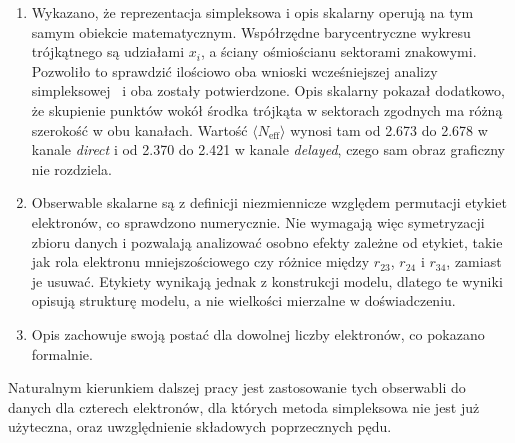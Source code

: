 \documentclass[12pt,a4paper]{article}
\newcommand{\Neff}{N_{\mathrm{eff}}}
\begin{document}
\begin{enumerate}
        podział pędu jest mniej równomierny. W kanale \emph{delayed}
        efektywna liczba elektronów i stosunek $\langle K/A\rangle$
        pozostają stałe, więc wzrost skali nierównowagi
        $\langle K\rangle$ nie oznacza zmiany nierównomierności podziału.
        Zmieniają się tam natomiast średni udział pędu elektronu
        mniejszościowego $\langle x_{\mathrm{mn}}\rangle$ oraz średnia
        korelacja par. Zmiany symetrycznych obserwabli podziału
        wywołane intensywnością są wielokrotnie mniejsze od różnicy
        między kanałami, która dla $\langle\Neff\rangle$ wynosi od
        \num{0.254} do \num{0.299}.
        Sposób podziału pędu jest więc przede wszystkim własnością
        ścieżki jonizacji.
  \item Wykazano, że reprezentacja simpleksowa i opis skalarny operują
        na tym samym obiekcie matematycznym. Współrzędne barycentryczne
        wykresu trójkątnego są udziałami $x_i$, a ściany ośmiościanu
        sektorami znakowymi. Pozwoliło to sprawdzić ilościowo oba
        wnioski wcześniejszej analizy simpleksowej~\cite{Ojczenasz2023}
        i oba zostały potwierdzone. Opis skalarny pokazał dodatkowo, że
        skupienie punktów wokół środka trójkąta w sektorach zgodnych ma
        różną szerokość w obu kanałach. Wartość $\langle\Neff\rangle$
        wynosi tam od \num{2.673} do \num{2.678} w kanale \emph{direct}
        i od \num{2.370} do \num{2.421} w kanale \emph{delayed}, czego
        sam obraz graficzny nie rozdziela.
  \item Obserwable skalarne są z definicji niezmiennicze względem
        permutacji etykiet elektronów, co sprawdzono numerycznie. Nie
        wymagają więc symetryzacji zbioru danych i pozwalają analizować
        osobno efekty zależne od etykiet, takie jak rola elektronu
        mniejszościowego czy różnice między $r_{23}$, $r_{24}$
        i $r_{34}$, zamiast je usuwać. Etykiety wynikają jednak
        z konstrukcji modelu, dlatego te wyniki opisują strukturę
        modelu, a nie wielkości mierzalne w doświadczeniu.
  \item Opis zachowuje swoją postać dla dowolnej liczby elektronów, co
        pokazano formalnie.
\end{enumerate}
Naturalnym kierunkiem dalszej pracy jest zastosowanie tych obserwabli
do danych dla czterech elektronów, dla których metoda simpleksowa nie
jest już użyteczna, oraz uwzględnienie składowych poprzecznych pędu.

\appendix
\end{document}
